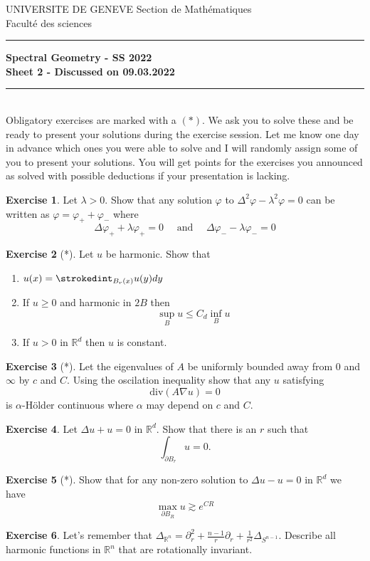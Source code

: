 \documentclass[a4paper,11pt]{article}
\theoremstyle{definition}
\newtheorem{exercise}{Exercise}
\begin{document}
\pagestyle{headings}
\noindent UNIVERSITE DE GENEVE \hfill Section de Mathématiques\\
\noindent Facult\'e des sciences \hfill \\[-3mm]
\hrule

\large

\begin{center}
\textbf{Spectral Geometry - SS 2022 \\ Sheet 2 - Discussed on 09.03.2022}
\end{center}
\hrule
\text{}\\[1cm]

Obligatory exercises are marked with a $(*)$. We ask you to solve these and be ready to present your solutions during the exercise session. Let me know one day in advance which ones you were able to solve and I will randomly assign some of you to present your solutions. You will get points for the exercises you announced as solved with possible deductions if your presentation is lacking.

\begin{exercise}
	Let $\lambda > 0$. Show that any solution $\varphi$ to $\Delta^2 \varphi - \lambda^2 \varphi = 0$ can be written as $\varphi = \varphi_+ + \varphi_-$ where
	\[ \Delta \varphi_+ + \lambda \varphi_+ = 0  \quad \text{ and } \quad \Delta \varphi_- - \lambda \varphi_- = 0 \]
\end{exercise}

\begin{exercise}[*]
	Let $u$ be harmonic. Show that 
	\begin{enumerate}
		\item $u(x) = \strokedint_{B_r(x)} u(y) dy$
		\item If $u \geq 0$ and harmonic in $2B$ then
			\[\sup_B u \leq C_d \inf_B u\]
		\item If $u>0$ in $\mathbb{R}^d$ then $u$ is constant.
	\end{enumerate}
\end{exercise}

\begin{exercise}[*]
	Let the eigenvalues of $A$ be uniformly bounded away from $0$ and $\infty$ by $c$ and $C$. Using the oscilation inequality show that any $u$ satisfying 
	\[\text{div}(A \nabla u) = 0\]
	is $\alpha$-Hölder continuous where $\alpha$ may depend on $c$ and $C$.
\end{exercise}

\begin{exercise}
	Let $\Delta u + u = 0$ in $\mathbb{R}^d$. Show that there is an $r$ such that
	\[ \int_{\partial B_r} u = 0. \]
\end{exercise}

\begin{exercise}[*]
	Show that for any non-zero solution to $\Delta u - u = 0$ in $\mathbb{R}^d$ we have 
	\[ \max_{\partial B_R} u \gtrsim e^{CR} \]
\end{exercise}

\begin{exercise}
	Let's remember that $\Delta_{\mathbb{R}^n} = \partial^2_r + \frac{n-1}{r} \partial_r + \frac{1}{r^2} \Delta_{S^{n-1}}$. Describe all harmonic functions in $\mathbb{R}^n$ that are rotationally invariant.
\end{exercise}
\end{document}
